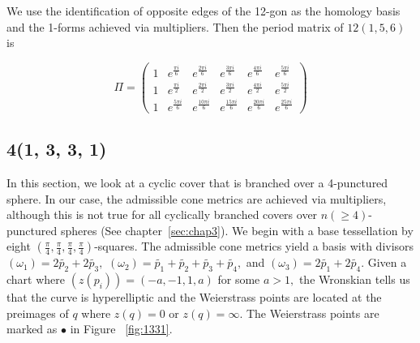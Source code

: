 \documentclass[12pt,reqno]{amsart}
\DeclareMathOperator{\Aut}{Aut}
\theoremstyle{definition}
\theoremstyle{remark}
\newtheorem*{remark}{Remark}
\begin{document}


We use the identification of opposite edges of the 12-gon as the homology basis and the 1-forms achieved via multipliers. Then the period matrix of $12(1, 5, 6)$ is

$$\Pi = \begin{pmatrix}1 & e^{\frac{\pi i}{6}} & e^{\frac{2 \pi i}{6}} & e^{\frac{3 \pi i}{6}} & e^{\frac{4 \pi i}{6}} & e^{\frac{5 \pi i}{6}}\\
1 & e^{\frac{\pi i}{2}} & e^{\frac{2 \pi i}{2}} & e^{\frac{3 \pi i}{2}} & e^{\frac{4 \pi i}{2}} & e^{\frac{5 \pi i}{2}}\\
1 & e^{\frac{5 \pi i}{6}} & e^{\frac{10 \pi i}{6}} & e^{\frac{15 \pi i}{6}} & e^{\frac{20 \pi i}{6}} & e^{\frac{25 \pi i}{6}}\end{pmatrix}$$


\subsection{4(1, 3, 3, 1)}

In this section, we look at a cyclic cover that is branched over a 4-punctured sphere. In our case, the admissible cone metrics are achieved via multipliers, although this is not true for all cyclically branched covers over $n (\geq 4)$-punctured spheres (See chapter~\ref{sec:chap3}). We begin with a base tessellation by eight $(\frac{\pi}{4}, \frac{\pi}{4}, \frac{\pi}{4}, \frac{\pi}{4})$-squares. The admissible cone metrics yield a basis with divisors $(\omega_1) = 2 \widetilde{p_2} + 2 \widetilde{p_3},$ $(\omega_2) = \widetilde{p_1} + \widetilde{p_2} + \widetilde{p_3} + \widetilde{p_4},$ and $(\omega_3) = 2 \widetilde{p_1} + 2 \widetilde{p_4}.$ Given a chart where $(z(p_i)) = (-a, -1, 1, a)$ for some $a > 1,$ the Wronskian tells us that the curve is hyperelliptic and the Weierstrass points are located at the preimages of $q$ where $z(q) = 0$ or $z(q) = \infty.$ The Weierstrass points are marked as $\bullet$ in Figure~ \cref{fig:1331}.
\end{document}

